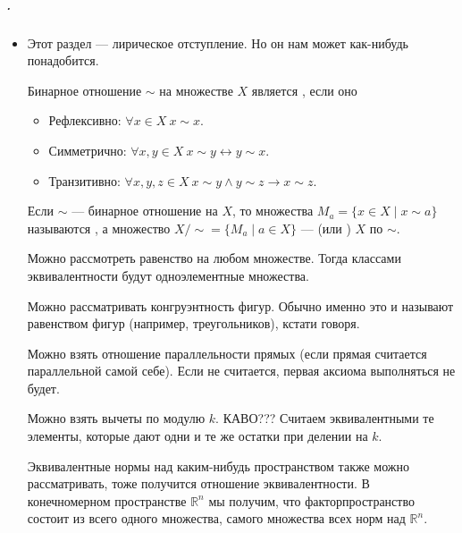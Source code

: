 \documentclass{article}
\begin{document}
    \subparagraph{.}
    \begin{itemize}
        \item[]
        \begin{Comment}
            Этот раздел --- лирическое отступление. Но он нам может как-нибудь понадобится.
        \end{Comment}
        \dfn Бинарное отношение $\sim$ на множестве $X$ является , если оно
        \begin{itemize}
            \item Рефлексивно: $\forall x\in X~x\sim x$.
            \item Симметрично: $\forall x,y\in X~x\sim y\leftrightarrow y\sim x$.
            \item Транзитивно: $\forall x,y,z\in X~x\sim y\land y\sim z\rightarrow x\sim z$.
        \end{itemize}
        \dfn Если $\sim$ --- бинарное отношение на $X$, то множества $M_a=\{x\in X\mid x\sim a\}$ называются , а множество $X/\sim=\{M_a\mid a\in X\}$ ---  (или ) $X$ по $\sim$.
        \begin{Example}
            Можно рассмотреть равенство на любом множестве. Тогда классами эквивалентности будут одноэлементные множества.
        \end{Example}
        \begin{Example}
            Можно рассматривать конгруэнтность фигур. Обычно именно это и называют равенством фигур (например, треугольников), кстати говоря.
        \end{Example}
        \begin{Example}
            Можно взять отношение параллельности прямых (если прямая считается параллельной самой себе). Если не считается, первая аксиома выполняться не будет.
        \end{Example}
        \begin{Example}
            Можно взять вычеты по модулю $k$. КАВО??? Считаем эквивалентными те элементы, которые дают одни и те же остатки при делении на $k$.
        \end{Example}
        \begin{Example}
            Эквивалентные нормы над каким-нибудь пространством также можно рассматривать, тоже получится отношение эквивалентности. В конечномерном пространстве $\mathbb R^n$ мы получим, что факторпространство состоит из всего одного множества, самого множества всех норм над $\mathbb R^n$.

\end{Example}
\end{itemize}
\end{document}
